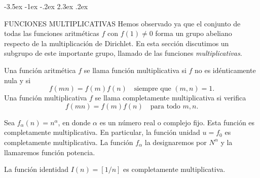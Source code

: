 \documentclass[12pt,a4paper]{book}
\makeatletter
\renewcommand\section{\@startsection{section}{1}{\z@}%
  {-3.5ex \@plus -1ex \@minus -.2ex}%
  {2.3ex \@plus .2ex}%
  {\normalfont\Large\bfseries\raggedright}}
\makeatother
\begin{document}
    \section{FUNCIONES MULTIPLICATIVAS}
    Hemos observado ya que el conjunto de todas las funciones aritméticas $f$ con
    $f(1)\neq0$ forma un grupo abeliano respecto de la multiplicación de Dirichlet. En esta
    sección discutimos un subgrupo de este importante grupo, llamado de las funciones
    \textit{multiplicativas}.

    \begin{definicion}
        Una función aritmética $f$ se llama función multiplicativa si $f$ no es
        idénticamente nula y si
        \begin{equation*}
            f(mn)=f(m)f(n)\quad\text{siempre que } (m,n)=1.
        \end{equation*}
        Una función multiplicativa $f$ se llama completamente multiplicativa si verifica
        \begin{equation*}
            f(mn)=f(m)f(n)\quad\text{para todo } m,n.
        \end{equation*}
    \end{definicion}

    \begin{ejemplo}
        Sea $f_{\alpha}(n)=n^{\alpha}$, en donde $\alpha$ es un número real o complejo fijo.
        Esta función es completamente multiplicativa. En particular, la función unidad
        $u=f_{0}$ es completamente multiplicativa. La función $f_{\alpha}$ la designaremos por
        $N^{\alpha}$ y la llamaremos función potencia.
    \end{ejemplo}

    \begin{ejemplo}
        La función identidad $I(n)=[1/n]$ es completamente multiplicativa.
    \end{ejemplo}
\end{document}
